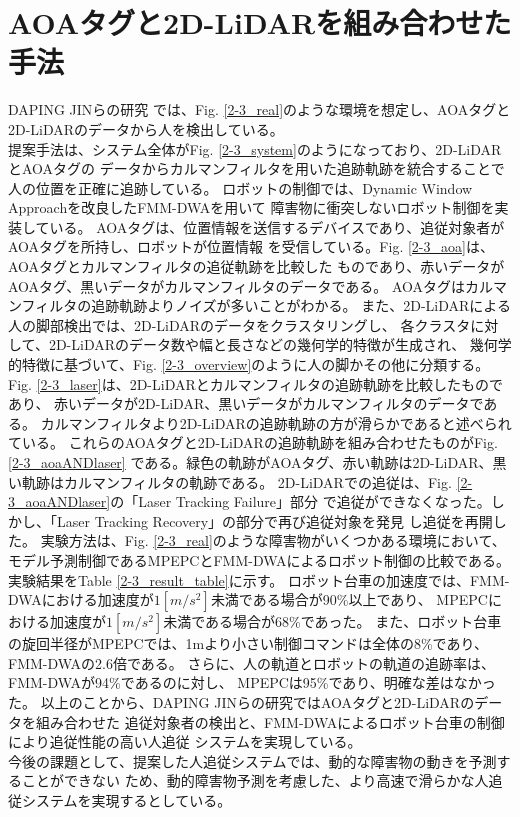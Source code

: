 \section{AOAタグと2D-LiDARを組み合わせた手法}
DAPING JINらの研究\cite{A Robust Autonomous Following Method for Mobile Robots in Dynamic Environments}
では、Fig. \ref{2-3_real}のような環境を想定し、AOAタグと2D-LiDARのデータから人を検出している。\\ \indent
提案手法は、システム全体がFig. \ref{2-3_system}のようになっており、2D-LiDARとAOAタグの
データからカルマンフィルタを用いた追跡軌跡を統合することで人の位置を正確に追跡している。
ロボットの制御では、Dynamic Window Approachを改良したFMM-DWAを用いて
障害物に衝突しないロボット制御を実装している。
AOAタグは、位置情報を送信するデバイスであり、追従対象者がAOAタグを所持し、ロボットが位置情報
を受信している。Fig. \ref{2-3_aoa}は、AOAタグとカルマンフィルタの追従軌跡を比較した
ものであり、赤いデータがAOAタグ、黒いデータがカルマンフィルタのデータである。
AOAタグはカルマンフィルタの追跡軌跡よりノイズが多いことがわかる。
また、2D-LiDARによる人の脚部検出では、2D-LiDARのデータをクラスタリングし、
各クラスタに対して、2D-LiDARのデータ数や幅と長さなどの幾何学的特徴が生成され、
幾何学的特徴に基づいて、Fig. \ref{2-3_overview}のように人の脚かその他に分類する。
Fig. \ref{2-3_laser}は、2D-LiDARとカルマンフィルタの追跡軌跡を比較したものであり、
赤いデータが2D-LiDAR、黒いデータがカルマンフィルタのデータである。
カルマンフィルタより2D-LiDARの追跡軌跡の方が滑らかであると述べられている。
これらのAOAタグと2D-LiDARの追跡軌跡を組み合わせたものがFig. \ref{2-3_aoaANDlaser}
である。緑色の軌跡がAOAタグ、赤い軌跡は2D-LiDAR、黒い軌跡はカルマンフィルタの軌跡である。
2D-LiDARでの追従は、Fig. \ref{2-3_aoaANDlaser}の「Laser Tracking Failure」部分
で追従ができなくなった。しかし、「Laser Tracking Recovery」の部分で再び追従対象を発見
し追従を再開した。
実験方法は、Fig. \ref{2-3_real}のような障害物がいくつかある環境において、
モデル予測制御であるMPEPCとFMM-DWAによるロボット制御の比較である。
実験結果をTable \ref{2-3_result_table}に示す。
ロボット台車の加速度では、FMM-DWAにおける加速度が$1[m/s^2]$未満である場合が90\%以上であり、
MPEPCにおける加速度が$1[m/s^2]$未満である場合が68\%であった。
また、ロボット台車の旋回半径がMPEPCでは、1mより小さい制御コマンドは全体の8\%であり、
FMM-DWAの2.6倍である。
さらに、人の軌道とロボットの軌道の追跡率は、FMM-DWAが94\%であるのに対し、
MPEPCは95\%であり、明確な差はなかった。
以上のことから、DAPING JINらの研究ではAOAタグと2D-LiDARのデータを組み合わせた
追従対象者の検出と、FMM-DWAによるロボット台車の制御により追従性能の高い人追従
システムを実現している。\\ \indent
今後の課題として、提案した人追従システムでは、動的な障害物の動きを予測することができない
ため、動的障害物予測を考慮した、より高速で滑らかな人追従システムを実現するとしている。

